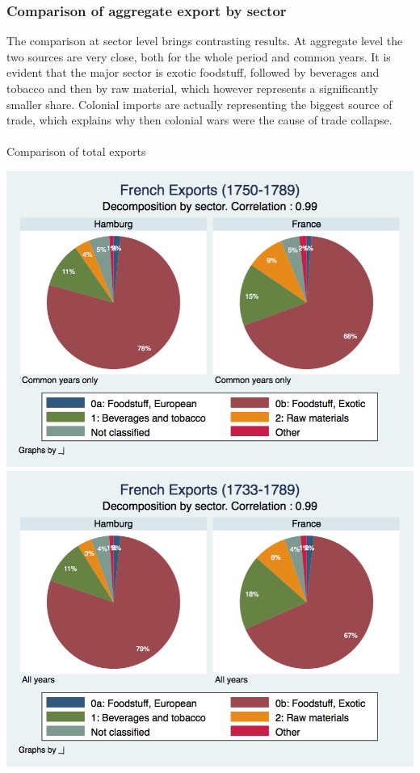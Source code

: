 \documentclass[12pt,a4paper,titlepage,english]{article}
\begin{document}
\subsubsection{Comparison of aggregate export by sector}
The comparison at sector level brings contrasting results. At aggregate level the two sources are very close, both for the whole period and common years. It is evident that the major sector is exotic foodstuff, followed by beverages and tobacco and then by raw material, which however represents a significantly smaller share. Colonial imports are actually representing the biggest source of trade, which explains why then colonial wars were the cause of trade collapse. \\~\\
\caption{Comparison of total exports}
\includegraphics[scale=.28]{commonyears_sector.png}
\includegraphics[scale=.28]{allyears_sector.png}
\end{document}
